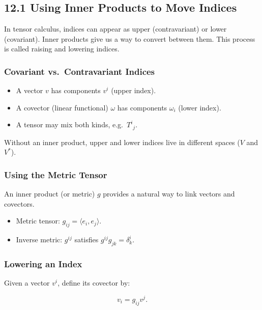 \documentclass[
  letterpaper,
  DIV=11,
  numbers=noendperiod]{scrreprt}
\providecommand{\tightlist}{%
  \setlength{\itemsep}{0pt}\setlength{\parskip}{0pt}}
\begin{document}
\subsection{12.1 Using Inner Products to Move
Indices}\label{using-inner-products-to-move-indices}

In tensor calculus, indices can appear as upper (contravariant) or lower
(covariant). Inner products give us a way to convert between them. This
process is called raising and lowering indices.

\subsubsection{Covariant vs.~Contravariant
Indices}\label{covariant-vs.-contravariant-indices-1}

\begin{itemize}
\tightlist
\item
  A vector \(v\) has components \(v^i\) (upper index).
\item
  A covector (linear functional) \(\omega\) has components \(\omega_i\)
  (lower index).
\item
  A tensor may mix both kinds, e.g.~\(T^{i}{}_{j}\).
\end{itemize}

Without an inner product, upper and lower indices live in different
spaces (\(V\) and \(V^*\)).

\subsubsection{Using the Metric Tensor}\label{using-the-metric-tensor}

An inner product (or metric) \(g\) provides a natural way to link
vectors and covectors.

\begin{itemize}
\tightlist
\item
  Metric tensor: \(g_{ij} = \langle e_i, e_j \rangle\).
\item
  Inverse metric: \(g^{ij}\) satisfies \(g^{ij} g_{jk} = \delta^i_k\).
\end{itemize}

\subsubsection{Lowering an Index}\label{lowering-an-index}

Given a vector \(v^i\), define its covector by:

\[
v_i = g_{ij} v^j.
\]
\end{document}
